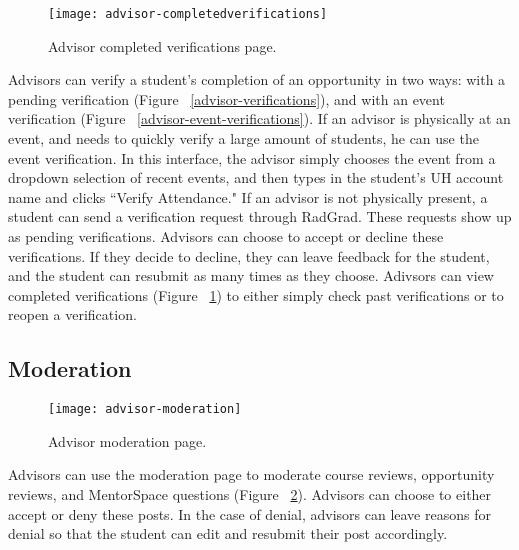 \begin{figure}[htbp!]
\centering
\texttt{[image: advisor-completedverifications]}
\caption{Advisor completed verifications page.}
\label{advisor-completed-verifications}
\end{figure}
Advisors can verify a student's completion of an opportunity in two ways: with a pending verification (Figure ~\ref{advisor-verifications}), and with an event verification (Figure ~\ref{advisor-event-verifications}). If an advisor is physically at an event, and needs to quickly verify a large amount of students, he can use the event verification. In this interface, the advisor simply chooses the event from a dropdown selection of recent events, and then types in the student's UH account name and clicks ``Verify Attendance." If an advisor is not physically present, a student can send a verification request through RadGrad. These requests show up as pending verifications. Advisors can choose to accept or decline these verifications. If they decide to decline, they can leave feedback for the student, and the student can resubmit as many times as they choose. Adivsors can view completed verifications (Figure ~\ref{advisor-completed-verifications}) to either simply check past verifications or to reopen a verification.
\subsection{Moderation}
\begin{figure}[htbp!]
\centering
\texttt{[image: advisor-moderation]}
\caption{Advisor moderation page.}
\label{moderation}
\end{figure}
Advisors can use the moderation page to moderate course reviews, opportunity reviews, and MentorSpace questions (Figure ~\ref{moderation}). Advisors can choose to either accept or deny these posts. In the case of denial, advisors can leave reasons for denial so that the student can edit and resubmit their post accordingly. 
